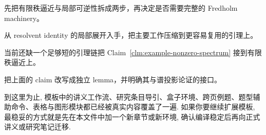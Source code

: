 \documentclass[a4paper,12pt,oneside]{maki-notes}
\begin{document}
\begin{proofsketch}
先把有限秩逼近与局部可逆性拆成两步，再决定是否需要完整的 Fredholm machinery。
\end{proofsketch}

\begin{idea}
从 resolvent identity 的局部展开入手，把主要工作压缩到更容易复用的引理上。
\end{idea}

\begin{obstacle}
当前还缺一个足够短的引理链把 Claim~\ref{clm:example-nonzero-spectrum} 接到有限秩逼近上。
\end{obstacle}

\begin{nextstep}
把上面的 claim 改写成独立 lemma，并明确其与谱投影论证的接口。
\end{nextstep}

\PrintSymbolIndex
\PrintOpenProblemIndex

\begin{note}
到这里为止, 模板中的讲义工作流、研究条目导引、盒子环境、跨页例题、题型辅助命令、表格与图形模块都已经被真实内容覆盖了一遍. 如果你要继续扩展模板, 最稳妥的方式就是先在本文件中加一个新章节或新环境, 确认编译稳定后再向正式讲义或研究笔记迁移.
\end{note}
\end{document}
